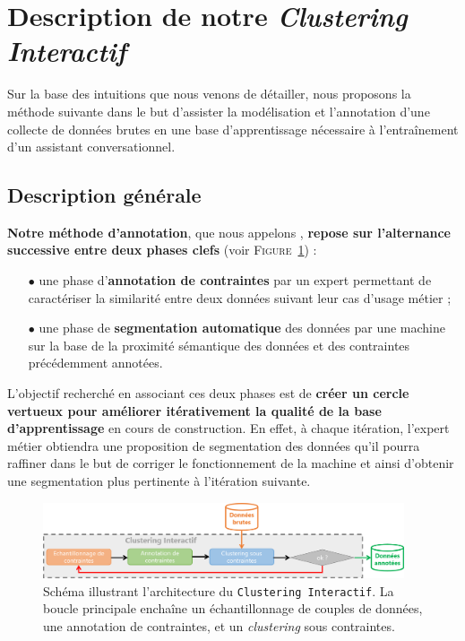 \section{Description de notre \textit{Clustering Interactif}}
\label{section:3.2-DESCRIPTION-THEORIQUE}

	Sur la base des intuitions que nous venons de détailler, nous proposons la méthode suivante dans le but d'assister la modélisation et l'annotation d'une collecte de données brutes en une base d'apprentissage nécessaire à l'entraînement d'un assistant conversationnel.
	
	\subsection{Description générale}
	\label{section:3.2.1-DESCRIPTION-THEORIQUE-GENERALE}
	
		\textbf{Notre méthode d'annotation}, que nous appelons , \textbf{repose sur l'alternance successive entre deux phases clefs} (voir \textsc{Figure~\ref{figure:3.2.1-DESCRIPTION-THEORIQUE-GENERALE}}) :
		\begin{itemize}
			\item[\(\bullet\)] une phase d'\textbf{annotation de contraintes}
			par un expert permettant de caractériser la similarité entre deux données suivant leur cas d'usage métier ;
			\item[\(\bullet\)] une phase de \textbf{segmentation automatique} des données
			par une machine sur la base de la proximité sémantique des données et des contraintes précédemment annotées.
		\end{itemize}
		
		L'objectif recherché en associant ces deux phases est de \textbf{créer un cercle vertueux pour améliorer itérativement la qualité de la base d'apprentissage} en cours de construction.
		En effet, à chaque itération, l'expert métier obtiendra une proposition de segmentation des données qu'il pourra raffiner dans le but de corriger le fonctionnement de la machine et ainsi d'obtenir une segmentation plus pertinente à l'itération suivante.
		
		\begin{figure}[!htb]
			\centering
			\includegraphics[width=0.95\textwidth]{figures/interactive-clustering-architecture-sequentielle}
			\caption{
				Schéma illustrant l'architecture du \texttt{Clustering Interactif}.
				La boucle principale enchaîne un échantillonnage de couples de données, une annotation de contraintes, et un \textit{clustering} sous contraintes.
			}
			\label{figure:3.2.1-DESCRIPTION-THEORIQUE-GENERALE}
		\end{figure}
	

